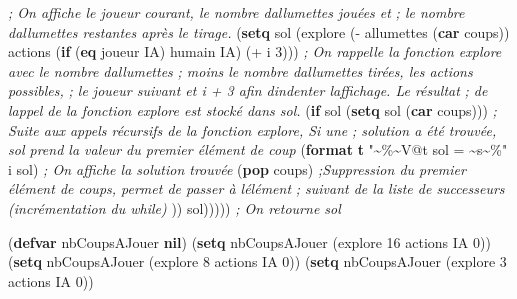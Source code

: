 \documentclass[
]{article}
\newenvironment{Shaded}{}{}
\newcommand{\CommentTok}[1]{\textcolor[rgb]{0.38,0.63,0.69}{\textit{#1}}}
\newcommand{\DecValTok}[1]{\textcolor[rgb]{0.25,0.63,0.44}{#1}}
\newcommand{\FunctionTok}[1]{\textcolor[rgb]{0.02,0.16,0.49}{#1}}
\newcommand{\KeywordTok}[1]{\textcolor[rgb]{0.00,0.44,0.13}{\textbf{#1}}}
\newcommand{\NormalTok}[1]{#1}
\newcommand{\OperatorTok}[1]{\textcolor[rgb]{0.40,0.40,0.40}{#1}}
\newcommand{\StringTok}[1]{\textcolor[rgb]{0.25,0.44,0.63}{#1}}
\begin{document}
\begin{Shaded}
\begin{algorithm}[H]
\begin{Highlighting}[]
               \CommentTok{; On affiche le joueur courant, le nombre d\textquotesingle{}allumettes jouées et}
               \CommentTok{; le nombre d\textquotesingle{}allumettes restantes après le tirage.}
\NormalTok{                (}\KeywordTok{setq}\NormalTok{ sol (explore (}\OperatorTok{{-}}\NormalTok{ allumettes (}\KeywordTok{car}\NormalTok{ coups)) actions }
\NormalTok{                (}\KeywordTok{if}\NormalTok{ (}\KeywordTok{eq}\NormalTok{ joueur \textquotesingle{}IA) \textquotesingle{}humain \textquotesingle{}IA) (}\OperatorTok{+}\NormalTok{ i }\DecValTok{3}\NormalTok{)))}
                \CommentTok{; On rappelle la fonction explore avec le nombre d\textquotesingle{}allumettes }
                \CommentTok{; moins le nombre d\textquotesingle{}allumettes tirées, les actions possibles, }
                \CommentTok{; le joueur suivant et i + 3 afin d\textquotesingle{}indenter l\textquotesingle{}affichage. Le résultat }
                \CommentTok{; de l\textquotesingle{}appel de la fonction explore est stocké dans sol.}
\NormalTok{                (}\KeywordTok{if}\NormalTok{ sol           }
\NormalTok{                    (}\KeywordTok{setq}\NormalTok{ sol (}\KeywordTok{car}\NormalTok{ coups)))}
                \CommentTok{; Suite aux appels récursifs de la fonction explore, Si une }
                \CommentTok{; solution a été trouvée, sol prend la valeur du premier élément de coup}
\NormalTok{               (}\KeywordTok{format} \KeywordTok{t} \StringTok{"\textasciitilde{}\%\textasciitilde{}V@t sol = \textasciitilde{}s\textasciitilde{}\%"}\NormalTok{ i sol)}
               \CommentTok{; On affiche la solution trouvée}
\NormalTok{               (}\KeywordTok{pop}\NormalTok{ coups)}
               \CommentTok{;Suppression du premier élément de coups, permet de passer à l\textquotesingle{}élément}
               \CommentTok{; suivant de la liste de successeurs (incrémentation du while) }
\NormalTok{               ))  }
\NormalTok{           sol)))))   \CommentTok{; On retourne sol}}
\end{Highlighting}
\end{algorithm}
\end{Shaded}      
    

\begin{Shaded}
    \begin{algorithm}[H]
\begin{Highlighting}[]
\NormalTok{(}\KeywordTok{defvar}\FunctionTok{ nbCoupsAJouer }\KeywordTok{nil}\NormalTok{)}
\NormalTok{(}\KeywordTok{setq}\NormalTok{ nbCoupsAJouer (explore }\DecValTok{16}\NormalTok{ actions \textquotesingle{}IA }\DecValTok{0}\NormalTok{))}
\NormalTok{(}\KeywordTok{setq}\NormalTok{ nbCoupsAJouer (explore }\DecValTok{8}\NormalTok{ actions \textquotesingle{}IA }\DecValTok{0}\NormalTok{))}
\NormalTok{(}\KeywordTok{setq}\NormalTok{ nbCoupsAJouer (explore }\DecValTok{3}\NormalTok{ actions \textquotesingle{}IA }\DecValTok{0}\NormalTok{))}
\end{Highlighting}
\end{algorithm}
\end{Shaded}
\end{document}

